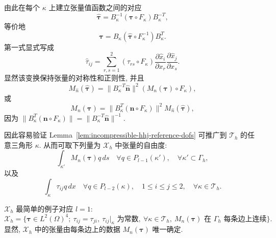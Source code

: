 由此在每个 $\kappa$ 上建立张量值函数之间的对应
\begin{equation}\label{eq:incompressible-hhj-tensor-piola-forward}
\widehat{\boldsymbol\tau}
=B_\kappa^{-1}(\boldsymbol\tau\circ F_\kappa)B_\kappa^{-T},
\end{equation}
等价地
\begin{equation}\label{eq:incompressible-hhj-tensor-piola-backward}
\boldsymbol\tau
=B_\kappa(\widehat{\boldsymbol\tau}\circ F_\kappa^{-1})B_\kappa^T.
\end{equation}
第一式显式写成
\[
\widehat\tau_{ij}
=\sum_{r,s=1}^2
(\tau_{rs}\circ F_\kappa)
\frac{\partial\widehat x_i}{\partial x_r}
\frac{\partial\widehat x_j}{\partial x_s}.
\]
显然该变换保持张量的对称性和正则性, 并且
\begin{equation}\label{eq:incompressible-hhj-normal-transform-forward}
M_{\widehat n}(\widehat{\boldsymbol\tau})
=\|B_\kappa^{-T}\widehat{\mathbf n}\|^2
(M_n(\boldsymbol\tau)\circ F_\kappa),
\end{equation}
或
\begin{equation}\label{eq:incompressible-hhj-normal-transform-backward}
M_n(\boldsymbol\tau)
=\|B_\kappa^T(\mathbf n\circ F_\kappa)\|^2
M_{\widehat n}(\widehat{\boldsymbol\tau}),
\end{equation}
因为
$\|B_\kappa^T(\mathbf n\circ F_\kappa)\|
=\|B_\kappa^{-T}\widehat{\mathbf n}\|^{-1}$.

因此容易验证 Lemma~\ref{lem:incompressible-hhj-reference-dofs}
可推广到 $\mathcal T_h$ 的任意三角形 $\kappa$.
从而可取下列量为 $\mathcal X_h$ 中张量的自由度:
\[
\int_{\kappa'}M_n(\boldsymbol\tau)q\,ds
\quad\forall q\in P_{l-1}(\kappa'),
\quad\forall\kappa'\subset\Gamma_h,
\]
以及
\[
\int_\kappa\tau_{ij}q\,dx
\quad\forall q\in P_{l-2}(\kappa),
\quad1\leq i\leq j\leq2,
\quad\forall\kappa\in\mathcal T_h.
\]

\begin{Remark}\label{rem:incompressible-hhj-linear-tensor-space}
$\mathcal X_h$ 最简单的例子对应 $l=1$:
\[
\mathcal X_h
=\{\boldsymbol\tau\in L^2(\Omega)^4;
\ \tau_{ij}=\tau_{ji},
\ \tau_{ij}|_\kappa\text{ 为常数},
\ \forall\kappa\in\mathcal T_h,
\ M_n(\boldsymbol\tau)\text{ 在 }\Gamma_h\text{ 每条边上连续}\}.
\]
显然, $\mathcal X_h$ 中的张量由每条边上的数据
$M_n(\boldsymbol\tau)$ 唯一确定.
\end{Remark}

